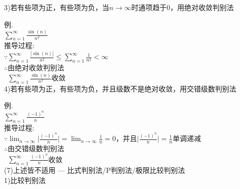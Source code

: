 3)若有些项为正，有些项为负，当$n\to\infty$时通项趋于0，用绝对收敛判别法\\
\begin{center}
\end{center}
例.\\
$\displaystyle\sum_{n=1}^{\infty}\frac{\sin(n)}{n^2}$\\[1ex]
推导过程:\\
$\because\displaystyle\sum_{n=1}^{\infty}\frac{|\sin(n)|}{n^2}\leqslant\sum_{n=1}^{\infty}\frac{1}{n^2}<\infty$\\
$\therefore$由绝对收敛判别法\\
$\phantom{\therefore}\displaystyle\sum_{n=1}^{\infty}\frac{\sin(n)}{n^2}$收敛\\[2ex]

4)若有些项为正，有些项为负，并且级数不是绝对收敛，用交错级数判别法\\
\begin{center}
\end{center}
例.\\
$\displaystyle\sum_{n=1}^{\infty}\frac{(-1)^n}{n}$\\[1ex]
推导过程:\\
$\because\displaystyle\lim_{n\to\infty}\Big|\frac{(-1)^n}{n}\Big|=\lim_{n\to\infty}\frac{1}{n}=0$，并且$\displaystyle\Big|\frac{(-1)^n}{n}\Big|=\frac{1}{n}$单调递减\\
$\therefore$由交错级数判别法\\
$\phantom{\therefore}\displaystyle\sum_{n=1}^{\infty}\frac{(-1)^n}{n}$收敛\\[2ex]

(7)上述皆不适用 --- 比式判别法/P判别法/极限比较判别法\\
1)比较判别法\\
\begin{center}
\\[2ex]
\end{center}\vspace{4ex}

